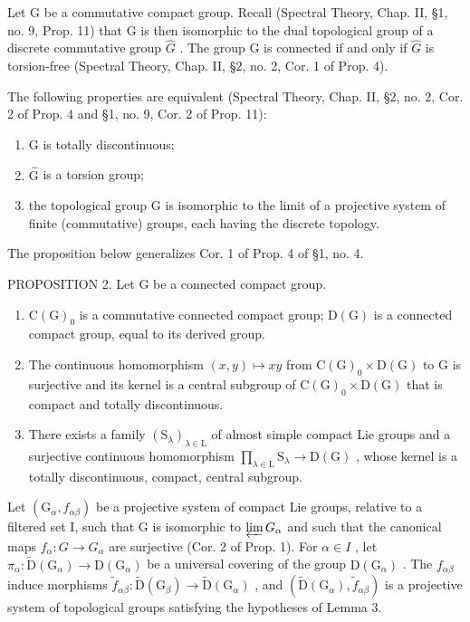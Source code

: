 
Let G be a commutative compact group. Recall (Spectral Theory, Chap. II, §1, no. 9, Prop. 11) that G is then isomorphic to the dual topological group of a discrete commutative group \(\hat{G}\) . The group G is connected if and only if \(\hat{G}\) is torsion-free (Spectral Theory, Chap. II, §2, no. 2, Cor. 1 of Prop. 4).

The following properties are equivalent (Spectral Theory, Chap. II, §2, no. 2, Cor. 2 of Prop. 4 and §1, no. 9, Cor. 2 of Prop. 11):

\begin{enumerate}
\def\labelenumi{(\roman{enumi})}
\item
  G is totally discontinuous;
\item
  \(\hat{\mathrm{G}}\) is a torsion group;
\item
  the topological group G is isomorphic to the limit of a projective system of finite (commutative) groups, each having the discrete topology.
\end{enumerate}

The proposition below generalizes Cor. 1 of Prop. 4 of §1, no. 4.

PROPOSITION 2. Let G be a connected compact group.

\begin{enumerate}
\def\labelenumi{\alph{enumi})}
\item
  \(\mathrm{C}(\mathrm{G})_{0}\) is a commutative connected compact group; \(\mathrm{D}(\mathrm{G})\) is a connected compact group, equal to its derived group.
\item
  The continuous homomorphism \((x,y)\mapsto xy\) from \(\mathrm{C}(\mathrm{G})_{0}\times\mathrm{D}(\mathrm{G})\) to G is surjective and its kernel is a central subgroup of \(\mathrm{C}(\mathrm{G})_{0}\times\mathrm{D}(\mathrm{G})\) that is compact and totally discontinuous.
\item
  There exists a family \((\mathrm{S}_{\lambda})_{\lambda\in\mathrm{L}}\) of almost simple compact Lie groups and a surjective continuous homomorphism \(\prod_{\lambda\in\mathrm{L}}\mathrm{S}_{\lambda}\to\mathrm{D}(\mathrm{G})\) , whose kernel is a totally discontinuous, compact, central subgroup.
\end{enumerate}

Let \((\mathrm{G}_{\alpha}, f_{\alpha\beta})\) be a projective system of compact Lie groups, relative to a filtered set I, such that G is isomorphic to \(\varprojlim G_{\alpha}\) and such that the canonical maps \(f_{\alpha}: G \to G_{\alpha}\) are surjective (Cor. 2 of Prop. 1). For \(\alpha \in I\) , let \(\pi_{\alpha}: \tilde{\mathrm{D}}(\mathrm{G}_{\alpha}) \to \mathrm{D}(\mathrm{G}_{\alpha})\) be a universal covering of the group \(\mathrm{D}(\mathrm{G}_{\alpha})\) . The \(f_{\alpha\beta}\) induce morphisms \(\tilde{f}_{\alpha\beta}: \tilde{\mathrm{D}}(\mathrm{G}_{\beta}) \to \tilde{\mathrm{D}}(\mathrm{G}_{\alpha})\) , and \((\tilde{\mathrm{D}}(\mathrm{G}_{\alpha}), \tilde{f}_{\alpha\beta})\) is a projective system of topological groups satisfying the hypotheses of Lemma 3.

